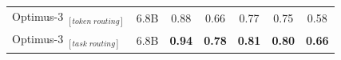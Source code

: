 \begin{table}[t]
{\begin{tabular}{lcccccc}
\hline
\rowcolor[HTML]{E7EEFE}
Optimus-3 $_{[token\;routing]}$            &    6.8B &  0.88   &   0.66  & 0.77   &  0.75  &  0.58    \\
\rowcolor[HTML]{E7EEFE}
Optimus-3 $_{[task\;routing]}$            &    6.8B &   \textbf{0.94}   &   \textbf{0.78}  & \textbf{0.81}   & \textbf{0.80}  &    \textbf{0.66}   \\
\bottomrule[1.2pt]
\end{tabular}
}
\end{table}


